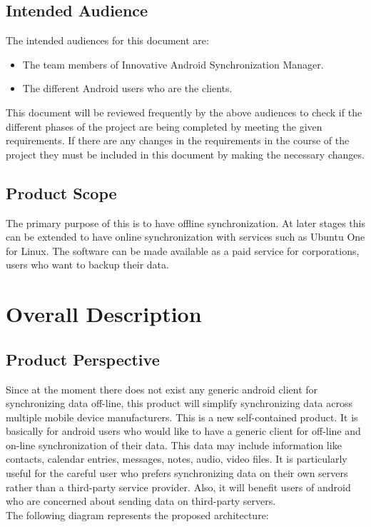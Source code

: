 \subsection{Intended Audience}
The intended audiences for this document are:
\begin{itemize}
 \item The team members of Innovative Android Synchronization Manager.
 \item The different Android users who are the clients.
\end{itemize}

This document will be reviewed frequently by the above audiences to check if the different
phases of the project are being completed by meeting the given requirements. If there are any changes
in the requirements in the course of the project they must be included in this document by making the
necessary changes.
\subsection{Product Scope}
\hspace*{0.82cm}The primary purpose of this is to have offline synchronization. At later stages this can be
extended to have online synchronization with services such as Ubuntu One for Linux. The software
can be made available as a paid service for corporations, users who want to backup their data.
\section{Overall Description}
\subsection{Product Perspective}
\hspace*{0.82cm}Since at the moment there does not exist any generic android client for synchronizing data
off-line, this product will simplify synchronizing data across multiple mobile device manufacturers.
This is a new self-contained product. It is basically for android users who would like to have a generic
client for off-line and on-line synchronization of their data. This data may include information like
contacts, calendar entries, messages, notes, audio, video files. It is particularly useful for the careful
user who prefers synchronizing data on their own servers rather than a third-party service provider.
Also, it will benefit users of android who are concerned about sending data on third-party servers.\\[0.5cm]
The following diagram represents the proposed architecture:

